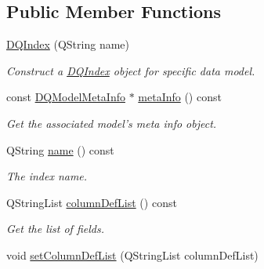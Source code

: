 \subsection*{Public Member Functions}
\begin{DoxyCompactItemize}
\item 
\hypertarget{classDQIndex_aaf1c29d4deb738b3fe2a0fb805776103}{
\hyperlink{classDQIndex_aaf1c29d4deb738b3fe2a0fb805776103}{DQIndex} (QString name)}
\label{classDQIndex_aaf1c29d4deb738b3fe2a0fb805776103}

\begin{DoxyCompactList}\small\item\em Construct a \hyperlink{classDQIndex}{DQIndex} object for specific data model. \item\end{DoxyCompactList}\item 
\hypertarget{classDQBaseIndex_ada04425f089c2a130ee26b19a03e9ee0}{
const \hyperlink{classDQModelMetaInfo}{DQModelMetaInfo} $\ast$ \hyperlink{classDQBaseIndex_ada04425f089c2a130ee26b19a03e9ee0}{metaInfo} () const }
\label{classDQBaseIndex_ada04425f089c2a130ee26b19a03e9ee0}

\begin{DoxyCompactList}\small\item\em Get the associated model's meta info object. \item\end{DoxyCompactList}\item 
\hypertarget{classDQBaseIndex_aee0d4d9f93553c82b6db52d2b5af9844}{
QString \hyperlink{classDQBaseIndex_aee0d4d9f93553c82b6db52d2b5af9844}{name} () const }
\label{classDQBaseIndex_aee0d4d9f93553c82b6db52d2b5af9844}

\begin{DoxyCompactList}\small\item\em The index name. \item\end{DoxyCompactList}\item 
\hypertarget{classDQBaseIndex_aa1eec671727f4b358ec70c2b1b714060}{
QStringList \hyperlink{classDQBaseIndex_aa1eec671727f4b358ec70c2b1b714060}{columnDefList} () const }
\label{classDQBaseIndex_aa1eec671727f4b358ec70c2b1b714060}

\begin{DoxyCompactList}\small\item\em Get the list of fields. \item\end{DoxyCompactList}\item 
\hypertarget{classDQBaseIndex_a2f4550691f38fd762a80e1f2fbf7bd85}{
void \hyperlink{classDQBaseIndex_a2f4550691f38fd762a80e1f2fbf7bd85}{setColumnDefList} (QStringList columnDefList)}
\label{classDQBaseIndex_a2f4550691f38fd762a80e1f2fbf7bd85}


\end{DoxyCompactItemize}
